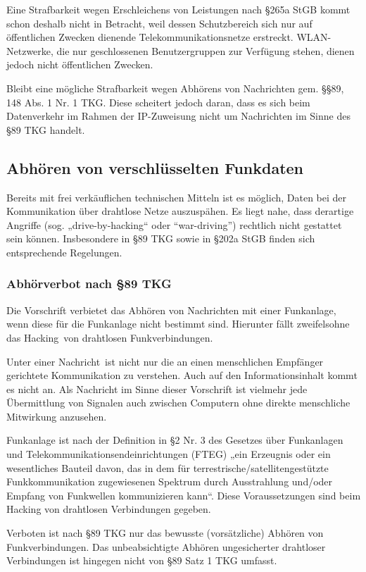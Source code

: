 \documentclass[10pt,a4paper]{article}
\begin{document}
Eine Strafbarkeit wegen Erschleichens von Leistungen nach §265a StGB kommt schon deshalb nicht in Betracht, weil dessen Schutzbereich sich nur auf öffentlichen Zwecken dienende Telekommunikationsnetze erstreckt. WLAN-Netzwerke, die nur geschlossenen Benutzergruppen zur Verfügung stehen, dienen jedoch nicht öffentlichen Zwecken.

Bleibt eine mögliche Strafbarkeit wegen Abhörens von Nachrichten gem. §§89, 148 Abs. 1 Nr. 1 TKG. Diese scheitert jedoch daran, dass es sich beim Datenverkehr im Rahmen der IP-Zuweisung nicht um Nachrichten im Sinne des §89 TKG handelt.

\subsection*{Abhören von verschlüsselten Funkdaten}
Bereits mit frei verkäuflichen technischen Mitteln ist es möglich, Daten bei der Kommunikation über drahtlose Netze auszuspähen. Es liegt nahe, dass derartige Angriffe (sog. „drive-by-hacking“ oder “war-driving”) rechtlich nicht gestattet sein können. Insbesondere in §89 TKG sowie in §202a StGB finden sich entsprechende Regelungen.


\subsubsection*{Abhörverbot nach §89 TKG}
Die Vorschrift verbietet das Abhören von Nachrichten mit einer Funkanlage, wenn diese für die Funkanlage nicht bestimmt sind. Hierunter fällt zweifelsohne das \glqq Hacking\grqq \ von drahtlosen Funkverbindungen.

Unter einer \glqq Nachricht\grqq \ ist nicht nur die an einen menschlichen Empfänger gerichtete Kommunikation zu verstehen. Auch auf den Informationsinhalt kommt es nicht an. Als Nachricht im Sinne dieser Vorschrift ist vielmehr jede Übermittlung von Signalen auch zwischen Computern ohne direkte menschliche Mitwirkung anzusehen.

Funkanlage ist nach der Definition in §2 Nr. 3 des Gesetzes über Funkanlagen und Telekommunikationsendeinrichtungen (FTEG) „ein Erzeugnis oder ein wesentliches Bauteil davon, das in dem für terrestrische/satellitengestützte Funkkommunikation zugewiesenen Spektrum durch Ausstrahlung und/oder Empfang von Funkwellen kommunizieren kann“. Diese Voraussetzungen sind beim Hacking von drahtlosen Verbindungen gegeben.

Verboten ist nach §89 TKG nur das bewusste (vorsätzliche) Abhören von Funkverbindungen. Das unbeabsichtigte Abhören ungesicherter drahtloser Verbindungen ist hingegen nicht von §89 Satz 1 TKG umfasst.
\end{document}

